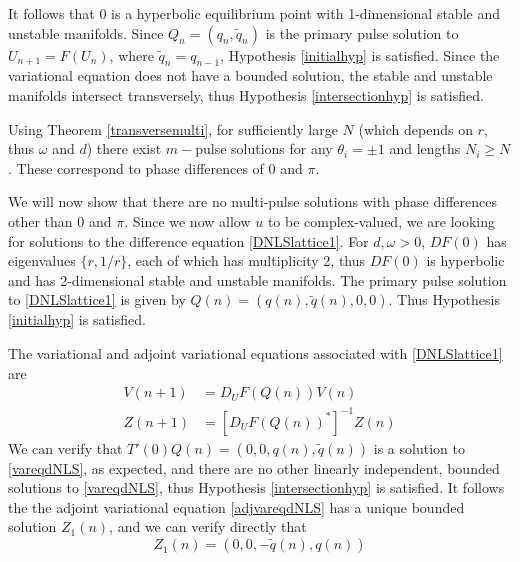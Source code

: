 \documentclass[12pt]{article}
\begin{document}
It follows that 0 is a hyperbolic equilibrium point with 1-dimensional stable and unstable manifolds. Since $Q_n = (q_n, \tilde{q}_n)$ is the primary pulse solution to $U_{n+1} = F(U_n)$, where $\tilde{q}_n = q_{n-1}$, Hypothesis \ref{initialhyp} is satisfied. Since the variational equation does not have a bounded solution, the stable and unstable manifolds intersect transversely, thus Hypothesis \ref{intersectionhyp} is satisfied. 

Using Theorem \ref{transversemulti}, for sufficiently large $N$ (which depends on $r$, thus $\omega$ and $d$) there exist $m-$pulse solutions for any $\theta_i = \pm 1$ and lengths $N_i \geq N$. These correspond to phase differences of $0$ and $\pi$.

We will now show that there are no multi-pulse solutions with phase differences other than $0$ and $\pi$. Since we now allow $u$ to be complex-valued, we are looking for solutions to the difference equation \eqref{DNLSlattice1}. For $d, \omega > 0$, $DF(0)$ has eigenvalues $\{r, 1/r\}$, each of which has multiplicity 2, thus $DF(0)$ is hyperbolic and has 2-dimensional stable and unstable manifolds. The primary pulse solution to \eqref{DNLSlattice1} is given by $Q(n) = (q(n), \tilde{q}(n), 0, 0)$. Thus Hypothesis \ref{initialhyp} is satisfied. 

The variational and adjoint variational equations associated with \eqref{DNLSlattice1} are
\begin{align}
V(n+1) &= D_U F(Q(n)) V(n) \label{vareqdNLS} \\
Z(n+1) &= [D_U F(Q(n))^*]^{-1} Z(n) \label{adjvareqdNLS}
\end{align}
We can verify that $T'(0) Q(n) = (0, 0, q(n), \tilde{q}(n))$ is a solution to \eqref{vareqdNLS}, as expected, and there are no other linearly independent, bounded solutions to \eqref{vareqdNLS}, thus Hypothesis \ref{intersectionhyp} is satisfied. It follows the the adjoint variational equation \eqref{adjvareqdNLS} has a unique bounded solution $Z_1(n)$, and we can verify directly that
\begin{equation}\label{defZ1}
Z_1(n) = (0, 0, -\tilde{q}(n), q(n))
\end{equation}
\end{document}
